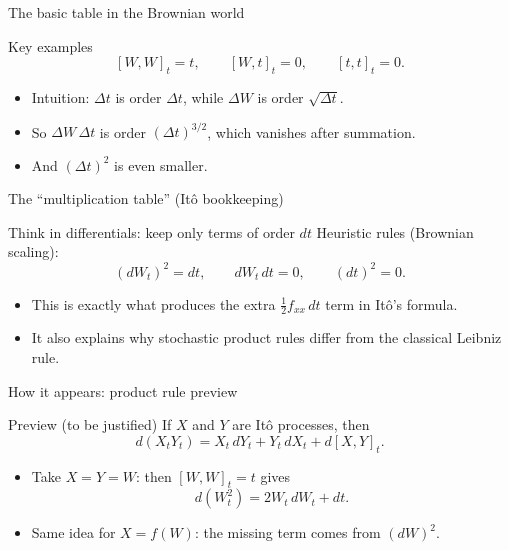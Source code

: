 \documentclass[10pt,aspectratio=169]{beamer}
\begin{document}
\begin{frame}{The basic table in the Brownian world}
\begin{block}{Key examples}
\[
[W,W]_t = t,
\qquad
[W,t]_t = 0,
\qquad
[t,t]_t = 0.
\]
\end{block}\pause

\begin{itemize}
  \item Intuition: $\Delta t$ is order $\Delta t$, while $\Delta W$ is order $\sqrt{\Delta t}$.\pause
  \item So $\Delta W\,\Delta t$ is order $(\Delta t)^{3/2}$, which vanishes after summation.\pause
  \item And $(\Delta t)^2$ is even smaller.
\end{itemize}
\end{frame}

\begin{frame}{The ``multiplication table'' (It\^o bookkeeping)}
\begin{alertblock}{Think in differentials: keep only terms of order $dt$}
Heuristic rules (Brownian scaling):
\[
(dW_t)^2 = dt,
\qquad
dW_t\,dt = 0,
\qquad
(dt)^2 = 0.
\]
\end{alertblock}\pause

\begin{itemize}
  \item This is exactly what produces the extra $\tfrac12 f_{xx}\,dt$ term in It\^o's formula.\pause
  \item It also explains why stochastic product rules differ from the classical Leibniz rule.
\end{itemize}
\end{frame}

\begin{frame}{How it appears: product rule preview}
\begin{block}{Preview (to be justified)}
If $X$ and $Y$ are It\^o processes, then
\[
d(X_tY_t)=X_t\,dY_t+Y_t\,dX_t+d[X,Y]_t.
\]
\end{block}\pause

\begin{itemize}
  \item Take $X=Y=W$: then $[W,W]_t=t$ gives
  \[
  d(W_t^2)=2W_t\,dW_t+dt.
  \]\pause
  \item Same idea for $X=f(W)$: the missing term comes from $(dW)^2$.
\end{itemize}
\end{frame}
\end{document}
